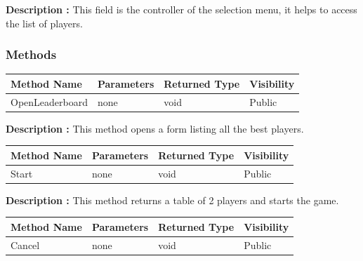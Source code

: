 \documentclass[12pt]{article}
\begin{document}
\textbf{Description :} This field is the controller of the selection menu, it helps to access the list of players.

\subsubsection{Methods}

\begin{table}[H]
    \begin{tabular}{|l|l|l|l|}
    \hline
    \rowcolor[HTML]{EFEFEF} 
    \cellcolor[HTML]{EFEFEF}\textbf{Method Name} & \textbf{Parameters}    & \textbf{Returned Type} & \textbf{Visibility} \\ \hline
    OpenLeaderboard                              & none                   & void                   & Public             \\ \hline
    \end{tabular}
\end{table}

\textbf{Description :} This method opens a form listing all the best players.

\begin{table}[H]
    \begin{tabular}{|l|l|l|l|}
    \hline
    \rowcolor[HTML]{EFEFEF} 
    \cellcolor[HTML]{EFEFEF}\textbf{Method Name} & \textbf{Parameters}    & \textbf{Returned Type} & \textbf{Visibility} \\ \hline
    Start                                        & none                   & void                   & Public             \\ \hline
    \end{tabular}
\end{table}

\textbf{Description :} This method returns a table of 2 players and starts the game.

\begin{table}[H]
    \begin{tabular}{|l|l|l|l|}
    \hline
    \rowcolor[HTML]{EFEFEF} 
    \cellcolor[HTML]{EFEFEF}\textbf{Method Name} & \textbf{Parameters}    & \textbf{Returned Type} & \textbf{Visibility} \\ \hline
    Cancel                                        & none                   & void                   & Public             \\ \hline
    \end{tabular}
\end{table}
\end{document}
